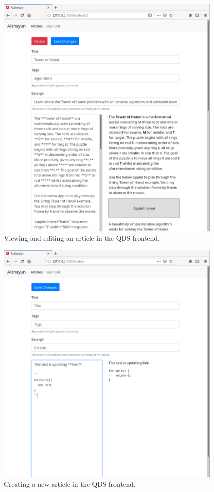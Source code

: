 \documentclass[12pt]{report}
\begin{document}
\begin{figure}
    \centering
    \includegraphics[scale=0.4]{images/qds-article-hanoi.png}
    \caption{Viewing and editing an article in the QDS frontend.}
    \label{fig:qds-article}
\end{figure}

\begin{figure}
    \centering
    \includegraphics[scale=0.4]{images/qds-create-new.png}
    \caption{Creating a new article in the QDS frontend.}
    \label{fig:qds-create-new}
\end{figure}
\end{document}
